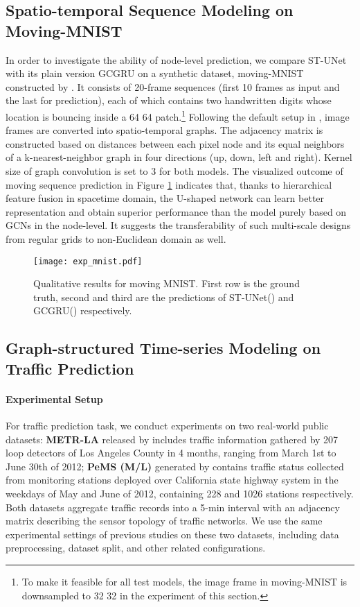 \documentclass[sigconf,screen]{acmart}
\begin{document}
\subsection{Spatio-temporal Sequence Modeling on Moving-MNIST}
In order to investigate the ability of node-level prediction, we compare ST-UNet with its plain version GCGRU on a synthetic dataset, moving-MNIST constructed by \cite{xingjian2015convolutional}. It consists of 20-frame sequences (first 10 frames as input and the last for prediction), each of which contains two handwritten digits whose location is bouncing inside a 64  64 patch.\footnote{To make it feasible for all test models, the image frame in moving-MNIST is downsampled to 32  32 in the experiment of this section.} Following the default setup in \cite{seo2018structured}, image frames are converted into spatio-temporal graphs. The adjacency matrix is constructed based on distances between each pixel node and its equal neighbors of a k-nearest-neighbor graph in four directions (up, down, left and right). Kernel size of graph convolution  is set to 3 for both models. The visualized outcome of moving sequence prediction in Figure \ref{fig:mmnist} indicates that, thanks to hierarchical feature fusion in spacetime domain, the U-shaped network can learn better representation and obtain superior performance than the model purely based on GCNs in the node-level. It suggests the transferability of such multi-scale designs from regular grids to non-Euclidean domain as well.

\begin{figure}
  \centering
  \texttt{[image: exp\_mnist.pdf]}
  \caption{\label{fig:mmnist}Qualitative results for moving MNIST. First row is the ground truth, second and third are the predictions of ST-UNet() and GCGRU() respectively.}
\end{figure}

\subsection{Graph-structured Time-series Modeling on Traffic Prediction}
\paragraph{Experimental Setup} 
For traffic prediction task, we conduct experiments on two real-world public datasets: \textbf{METR-LA} released by \cite{li2018dcrnn_traffic} includes traffic information gathered by 207 loop detectors of Los Angeles County in 4 months, ranging from March 1st to June 30th of 2012; \textbf{PeMS (M/L)} generated by \cite{yu2018spatio} contains traffic status collected from monitoring stations deployed over California state highway system in the weekdays of May and June of 2012, containing 228 and 1026 stations respectively. Both datasets aggregate traffic records into a 5-min interval with an adjacency matrix describing the sensor topology of traffic networks. We use the same experimental settings of previous studies on these two datasets, including data preprocessing, dataset split, and other related configurations.
\end{document}
